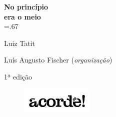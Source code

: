 




\begingroup\thispagestyle{empty}\vspace*{-.01\textheight}\parindent=0pt 
              \formular
              \huge 
              \textbf{No princípio\\era o meio}\\\baselineskip=.67\baselineskip 

              \medskip
              
              \LARGE
              Luiz Tatit
              
              \vspace{4cm}              

              \newfontfamily{}
              {\selectfont\minion\small Luís Augusto Fischer (\textit{organização})}
              
              \vspace{0.5cm}

              {\selectfont\minion\footnotesize
              1ª edição}
                    
              \vfill
              
              \begin{figure}
              \vspace*{-1.22\baselineskip}
              \includegraphics[width=3.5cm]{./logoacorde.png}
              \end{figure}


